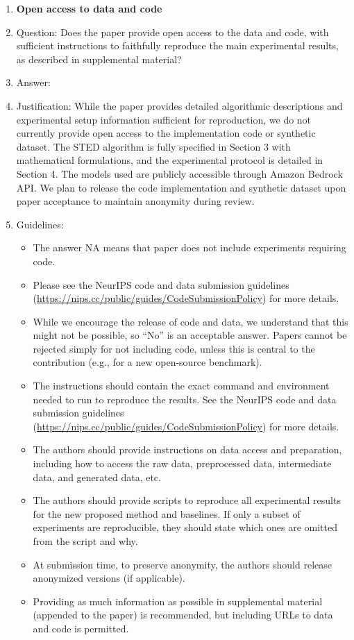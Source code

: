 \documentclass{article}
\begin{document}
\begin{enumerate}
\item {\bf Open access to data and code}
    \item[] Question: Does the paper provide open access to the data and code, with sufficient instructions to faithfully reproduce the main experimental results, as described in supplemental material?
    \item[] Answer: \answerNo{} %
    \item[] Justification: \justification While the paper provides detailed algorithmic descriptions and experimental setup information sufficient for reproduction, we do not currently provide open access to the implementation code or synthetic dataset. The STED algorithm is fully specified in Section 3 with mathematical formulations, and the experimental protocol is detailed in Section 4. The models used are publicly accessible through Amazon Bedrock API. We plan to release the code implementation and synthetic dataset upon paper acceptance to maintain anonymity during review.{}
    \item[] Guidelines:
    \begin{itemize}
        \item The answer NA means that paper does not include experiments requiring code.
        \item Please see the NeurIPS code and data submission guidelines (\url{https://nips.cc/public/guides/CodeSubmissionPolicy}) for more details.
        \item While we encourage the release of code and data, we understand that this might not be possible, so “No” is an acceptable answer. Papers cannot be rejected simply for not including code, unless this is central to the contribution (e.g., for a new open-source benchmark).
        \item The instructions should contain the exact command and environment needed to run to reproduce the results. See the NeurIPS code and data submission guidelines (\url{https://nips.cc/public/guides/CodeSubmissionPolicy}) for more details.
        \item The authors should provide instructions on data access and preparation, including how to access the raw data, preprocessed data, intermediate data, and generated data, etc.
        \item The authors should provide scripts to reproduce all experimental results for the new proposed method and baselines. If only a subset of experiments are reproducible, they should state which ones are omitted from the script and why.
        \item At submission time, to preserve anonymity, the authors should release anonymized versions (if applicable).
        \item Providing as much information as possible in supplemental material (appended to the paper) is recommended, but including URLs to data and code is permitted.
    \end{itemize}



\end{enumerate}
\end{document}
